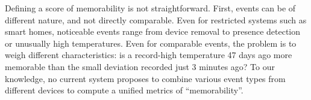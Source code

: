 \documentclass[entropy,article,submit,moreauthors,pdftex]{Definitions/mdpi}
\begin{document}

Defining a score of memorability is not straightforward. First, events can be of different nature, and not directly
comparable. Even for restricted systems such as smart homes, noticeable events
range from device removal to presence detection or unusually high
temperatures. Even for comparable events, the problem is to weigh different characteristics: is a record-high temperature 47 days
ago more memorable than the small deviation recorded just 3 minutes ago? To
our knowledge, no current system proposes to combine various
event types from different devices to compute a unified metrics of
``memorability''.


\end{document}
